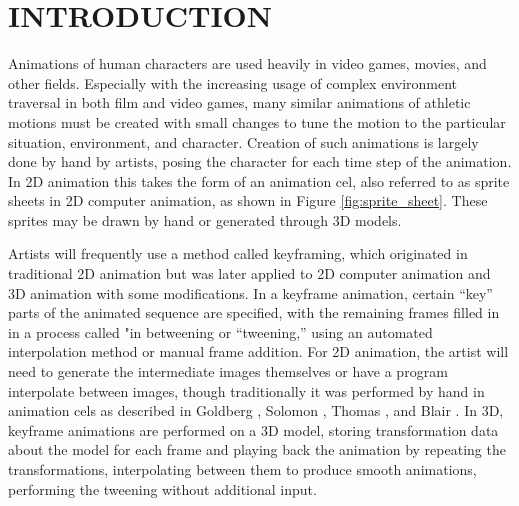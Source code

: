 
 
\chapter{INTRODUCTION}
\label{chapter:intro}

Animations of human characters are used heavily in video games, movies, and other fields.  Especially with the increasing usage of complex environment traversal in both film and video games, many similar animations of athletic motions must be created with small changes to tune the motion to the particular situation, environment, and character.  Creation of such animations is largely done by hand by artists, posing the character for each time step of the animation.  In 2D animation this takes the form of an animation cel, also referred to as sprite sheets in 2D computer animation, as shown in Figure \ref{fig:sprite_sheet}.  These sprites may be drawn by hand or generated through 3D models.

Artists will frequently use a method called keyframing, which originated in traditional 2D animation but was later applied to 2D computer animation and 3D animation with some modifications.  In a keyframe animation, certain ``key'' parts of the animated sequence are specified, with the remaining frames filled in in a process called "in betweening or ``tweening,'' using an automated interpolation method or manual frame addition.  For 2D animation, the artist will need to generate the intermediate images themselves or have a program interpolate between images, though traditionally it was performed by hand in animation cels as described in Goldberg \cite{goldberg_char_anim}, Solomon \cite{disney_hist}, Thomas \cite{disney_art}, and Blair \cite{cartoon_anim}.  In 3D, keyframe animations are performed on a 3D model, storing transformation data about the model for each frame and playing back the animation by repeating the transformations, interpolating between them to produce smooth animations, performing the tweening without additional input.


